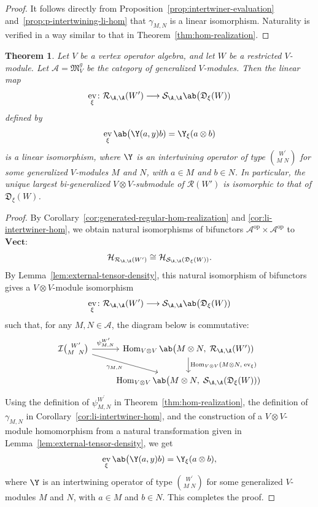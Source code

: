 \documentclass[12pt, english]{article}
\numberwithin{equation}{section}
\DeclareMathOperator{\Hom}{Hom}
\DeclareMathOperator{\opp}{op}
\DeclareMathOperator{\ev}{ev}
\theoremstyle{plain}
\newtheorem{theorem}[lemma]{Theorem}
\theoremstyle{definition}
\theoremstyle{remark}
\begin{document}
	\begin{proof}
		It follows directly from Proposition~\ref{prop:intertwiner-evaluation}  and~\ref{prop:p-intertwining-li-hom} that
		$\gamma_{M, N}$ is a linear isomorphism. Naturality is verified in a way similar to that in Theorem~\ref{thm:hom-realization}.
	\end{proof}
	
	\begin{theorem} \label{thm:li-regular-comparison}
		Let $V$ be a vertex operator algebra,
		and let $W$ be a restricted $V$-module. Let $\mathcal{A} = \mathfrak{M}^g_V$ be the category of generalized $V$-modules.
		Then the linear map
		\[
		\ev_{\xi} \colon \mathcal{R}_{\A, \A} (W^\prime) \longrightarrow \mathcal{S}_{\A, \A} \ab\big(\mathfrak{D}_{\xi}(W))
		\]
		defined by
		\[
		\ev_{\xi} \ab\big(\Y(a, y) b) = \Y_{\xi}(a \otimes b)
		\]
		is a linear isomorphism, where $\Y$ is an intertwining operator of type $\binom{W^\prime}{M \; N}$
		for some generalized $V$-modules $M$ and $N$, with $a \in M$ and $b \in N$.
		In particular, the unique largest bi-generalized $V\otimes V$-submodule of $\mathcal{R}(W')$ is isomorphic to that of $\mathfrak{D}_{\xi}(W)$.
		
	\end{theorem}
	
	\begin{proof}
		By Corollary~\ref{cor:generated-regular-hom-realization} and \ref{cor:li-intertwiner-hom}, we obtain natural isomorphisms of bifunctors
		$ \mathcal{A}^{\opp} \times \mathcal{A}^{\opp}$  to $\mathbf{Vect}$:
		\[
		\mathcal{H}_{\mathcal{R}_{\A, \A}(W^\prime)} \cong
		\mathcal{H}_{\mathcal{S}_{\A, \A} (\mathfrak{D}_{\xi}(W))}.
		\]
		By Lemma~\ref{lem:external-tensor-density}, this natural isomorphism of bifunctors gives a $V \otimes V$-module isomorphism
		\[
		\ev_{\xi} \colon \mathcal{R}_{\A, \A} (W^\prime) \longrightarrow \mathcal{S}_{\A, \A} \ab\big(\mathfrak{D}_{\xi}(W))
		\]
		such that, for any $M, N \in \mathcal{A}$, the diagram below is commutative:
		\[
		\begin{tikzcd}
			\mathcal{I}\binom{W^\prime}{M \; \;N}
			\arrow[r, "{\psi^{W^\prime}_{M, N}}"]
			\arrow[dr, "{\gamma_{M, N}}"']
			& \Hom_{V \otimes V} \ab\big(M \otimes N, \;   \mathcal{R}_{\A, \A} (W^\prime))
			\arrow[d, "{\Hom_{V\otimes V}(M \otimes N,  \; \ev_{\xi})}"]
			\\
			& \Hom_{V \otimes V} \ab\big(M\otimes N, \;\mathcal{S}_{\A, \A} (\mathfrak{D}_{\xi}(W)))
		\end{tikzcd}
		\]
		Using the definition of $\psi^{W^\prime}_{M, N}$ in Theorem~\ref{thm:hom-realization}, the definition of $\gamma_{M, N}$ in Corollary~\ref{cor:li-intertwiner-hom},
		and the construction of a $V\otimes V$-module homomorphism from a natural transformation given in
		Lemma~\ref{lem:external-tensor-density}, we get
		\[
		\ev_{\xi} \ab\big(\Y(a, y) b) = \Y_{\xi}(a \otimes b),
		\]
		where $\Y$ is an intertwining operator of type $\binom{W^\prime}{M \; N}$
		for some generalized $V$-modules $M$ and $N$, with $a \in M$ and $b \in N$.
		This completes the proof.
		
	\end{proof}
	
\end{document}
